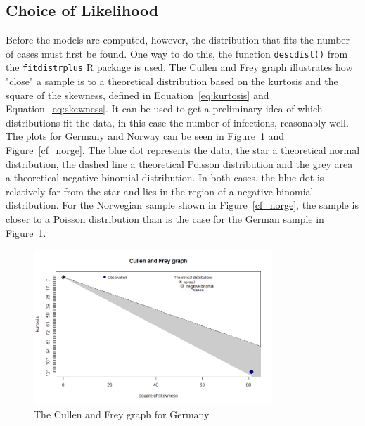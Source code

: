 \subsection{Choice of Likelihood}
Before the models are computed, however, the distribution that fits the number of cases must first be found. One way to do this, the function \texttt{descdist()} from the \texttt{fitdistrplus} R package is used. The Cullen and Frey graph illustrates how "close" a sample is to a theoretical distribution based on the kurtosis and the square of the skewness, defined in Equation~\ref{eq:kurtosis} and Equation~\ref{eq:skewness}. It can be used to get a preliminary idea of which distributions fit the data, in this case the number of infections, reasonably well. \\
The plots for Germany and Norway can be seen in Figure~\ref{cf_germany} and Figure~\ref{cf_norge}. The blue dot represents the data, the star a theoretical normal distribution, the dashed line a theoretical Poisson distribution and the grey area a theoretical negative binomial distribution. In both cases, the blue dot is relatively far from the star and lies in the region of a negative binomial distribution. For the Norwegian sample shown in Figure~\ref{cf_norge}, the sample is closer to a Poisson distribution than is the case for the German sample in Figure~\ref{cf_germany}.
%     
\begin{figure}[H]
    \centering
    \includegraphics[width = 0.8\textwidth]{cf_germany.png}
    \caption{The Cullen and Frey graph for Germany}
    \label{cf_germany}
\end{figure}
